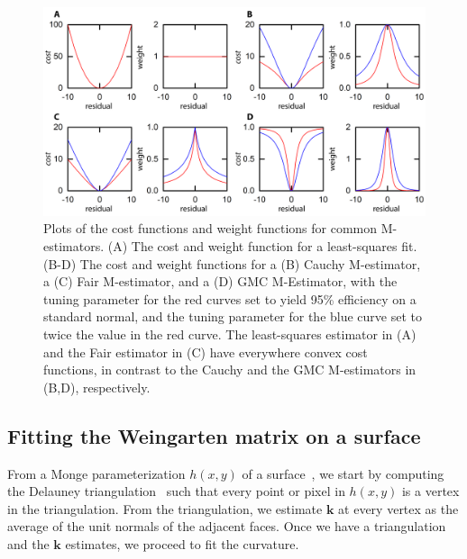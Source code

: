 \begin{figure}[H]
  \centering
  \includegraphics{figures/C3/Ch3-Figs_IRLSfxn.png}
  \caption{Plots of the cost functions and weight functions for common M-estimators.
  (A) The cost and weight function for a least-squares fit.
  (B-D) The cost and weight functions for a (B) Cauchy M-estimator, a (C) Fair M-estimator, and a (D) GMC M-Estimator, with the tuning parameter for the red curves set to yield 95\% efficiency on a standard normal, and the tuning parameter for the blue curve set to twice the value in the red curve.
  The least-squares estimator in (A) and the Fair estimator in (C) have everywhere convex cost functions, in contrast to the Cauchy and the GMC M-estimators in (B,D), respectively.}\label{f:3-CostFxn}
\end{figure}
\newpage
\subsection{Fitting the Weingarten matrix on a surface}
From a Monge parameterization $h(x,y)$ of a surface~\cite{RN35,RN23}, we start by computing the Delauney triangulation~\cite{RN34} such that every point or pixel in $h(x,y)$ is a vertex in the triangulation.
From the triangulation, we estimate $\mathbf{k}$ at every vertex as the average of the unit normals of the adjacent faces.
Once we have a triangulation and the $\mathbf{k}$ estimates, we proceed to fit the curvature.


